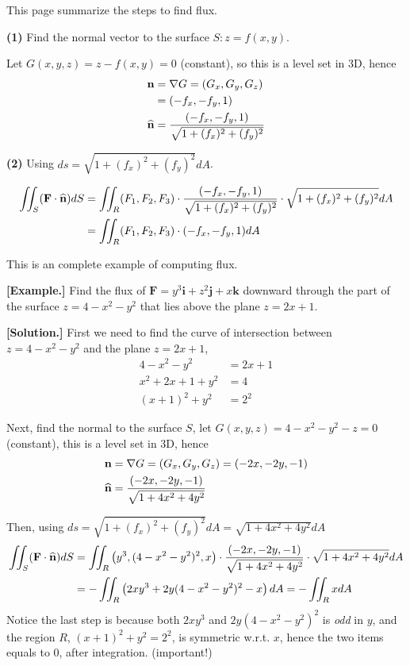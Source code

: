 \documentclass[11pt, a4paper]{MATH2023}
\newcommand{\eg}{\textbf{[Example.] }}
\newcommand{\sol}{\textbf{[Solution.] }}
\newcommand{\FF}{{\bf F}}
\begin{document}
\begin{spacing}{1.3}
    \newpage
    {\blue This page summarize the steps to find flux.}

    {\bf (1)} Find the normal vector to the surface $S: z=f(x,y)$.

    Let $G(x,y,z)=z-f(x,y)=0$ (constant), so this is a level set in 3D, hence 
    \begin{align*}
        {\bf n} &=\nabla G = (G_x, G_y, G_z)\\
                &= (-f_x, -f_y, 1)\\
        {\widehat{\bf{n}}}   &= \frac{(-f_x, -f_y, 1)}{\sqrt{1+(f_x)^2+(f_y)^2}}             
    \end{align*}

    {\bf (2)} Using $ds=\sqrt{1+(f_x)^2+(f_y)^2} dA$.

    \begin{align*}
        \iint_S(\FF\cdot \nm) dS &= \iint_R (F_1,F_2,F_3)\cdot 
                        \frac{(-f_x, -f_y, 1)}{\sqrt{1+(f_x)^2+(f_y)^2}} \cdot \sqrt{1+(f_x)^2+(f_y)^2} dA\\
                        &= \iint_R (F_1,F_2,F_3)\cdot (-f_x, -f_y, 1) dA
    \end{align*}

    \vspace{0.4in}
    {\blue This is an complete example of computing flux.}

    \eg Find the flux of $\mathbf{F}=y^{3} \mathbf{i}+z^{2} \mathbf{j}+x \mathbf{k}$ downward through 
    the part of the surface $z=4-x^{2}-y^{2}$ that lies above the plane $z=2 x+1$.
    
    \sol First we need to find the curve of intersection between 
    $z=4-x^2-y^2$ and the plane $z=2x+1$,
    \begin{align*}
        4-x^2-y^2 &= 2x+1\\
        x^2+2x+1+y^2 &= 4\\
        (x+1)^2+y^2 &= 2^2
    \end{align*}

    Next, find the normal to the surface $S$, let $G(x,y,z)=4-x^2-y^2-z=0$ (constant),
    this is a level set in 3D, hence 
    \begin{align*}
        {\bf n} &= \nabla G =(G_x, G_y, G_z) =(-2x, -2y, -1)\\
        {\widehat{\bf{n}} } &= \frac{(-2x, -2y, -1)}{\sqrt{1+4x^2+4y^2}}
    \end{align*}

    Then, using $ds=\sqrt{1+(f_x)^2+(f_y)^2} dA=\sqrt{1+4x^2+4y^2} dA$
    \begin{align*}
        \iint_S(\FF\cdot \nm) dS &= \iint_R \left(y^3, (4-x^2-y^2)^2, x\right)
            \cdot \frac{(-2x, -2y, -1)}{\sqrt{1+4x^2+4y^2}}\cdot \sqrt{1+4x^2+4y^2} dA\\
            &= -\iint_R \left(2xy^3+2y(4-x^2-y^2)^2-x\right) dA
            = -\iint_R x dA
    \end{align*}
    Notice the last step is because both $2xy^3$ and $2y(4-x^2-y^2)^2$ is {\it odd} in $y$,
    and the region $R$, $(x+1)^2+y^2 = 2^2$, is symmetric w.r.t. $x$, hence the two items 
    equals to 0, after integration. {\blue (important!)}


\end{spacing}
\end{document}
